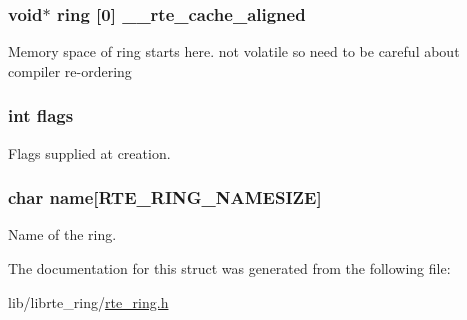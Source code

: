 \subsubsection[{\+\_\+\+\_\+rte\+\_\+cache\+\_\+aligned}]{\setlength{\rightskip}{0pt plus 5cm}void$\ast$ ring \mbox{[}0\mbox{]} \+\_\+\+\_\+rte\+\_\+cache\+\_\+aligned}\label{structrte__ring_ab3cabbb2d7c187c328e92a1293086010}
Memory space of ring starts here. not volatile so need to be careful about compiler re-\/ordering \hypertarget{structrte__ring_ac8bf36fe0577cba66bccda3a6f7e80a4}{}
\subsubsection[{flags}]{\setlength{\rightskip}{0pt plus 5cm}int flags}\label{structrte__ring_ac8bf36fe0577cba66bccda3a6f7e80a4}
Flags supplied at creation. \hypertarget{structrte__ring_a25143ba33a51e2c04774a1ca0a75af59}{}
\subsubsection[{name}]{\setlength{\rightskip}{0pt plus 5cm}char name\mbox{[}{\bf R\+T\+E\+\_\+\+R\+I\+N\+G\+\_\+\+N\+A\+M\+E\+S\+I\+Z\+E}\mbox{]}}\label{structrte__ring_a25143ba33a51e2c04774a1ca0a75af59}
Name of the ring. 

The documentation for this struct was generated from the following file\+:\begin{DoxyCompactItemize}
\item 
lib/librte\+\_\+ring/\hyperlink{rte__ring_8h}{rte\+\_\+ring.\+h}\end{DoxyCompactItemize}
